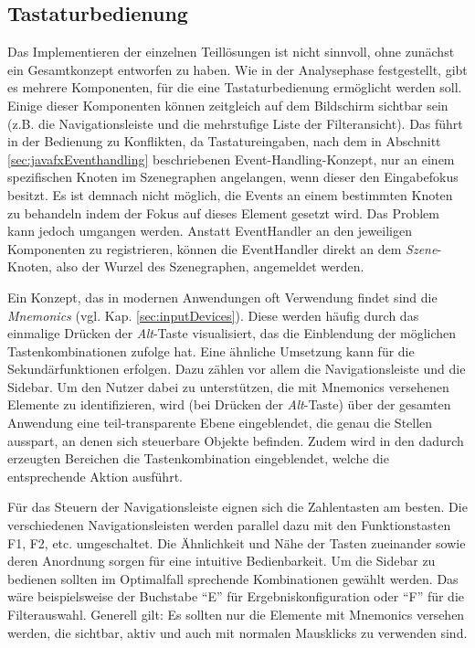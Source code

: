 \subsection{Tastaturbedienung} \label{sec:interactionKeyboard}
Das Implementieren der einzelnen Teillösungen ist nicht sinnvoll, ohne zunächst ein Gesamtkonzept entworfen zu haben. Wie in der Analysephase festgestellt, gibt es mehrere Komponenten, für die eine Tastaturbedienung ermöglicht werden soll. Einige dieser Komponenten können zeitgleich auf dem Bildschirm sichtbar sein (z.B. die Navigationsleiste und die mehrstufige Liste der Filteransicht). Das führt in der Bedienung zu Konflikten, da Tastatureingaben, nach dem in Abschnitt \ref{sec:javafxEventhandling} beschriebenen Event-Handling-Konzept, nur an einem spezifischen Knoten im Szenegraphen angelangen, wenn dieser den Eingabefokus besitzt. Es ist demnach nicht möglich, die Events an einem bestimmten Knoten zu behandeln indem der Fokus auf dieses Element gesetzt wird. Das Problem kann jedoch umgangen werden. Anstatt EventHandler an den jeweiligen Komponenten zu registrieren, können die EventHandler direkt an dem \textit{Szene}-Knoten, also der Wurzel des Szenegraphen, angemeldet werden.\par
{}
Ein Konzept, das in modernen Anwendungen oft Verwendung findet sind die \textit{Mnemonics} (vgl. Kap. \ref{sec:inputDevices}). Diese werden häufig durch das einmalige Drücken der \textit{Alt}-Taste visualisiert, das die Einblendung der möglichen Tastenkombinationen zufolge hat. Eine ähnliche Umsetzung kann für die Sekundärfunktionen erfolgen. Dazu zählen vor allem die Navigationsleiste und die Sidebar. Um den Nutzer dabei zu unterstützen, die mit Mnemonics versehenen Elemente zu identifizieren, wird (bei Drücken der \textit{Alt}-Taste) über der gesamten Anwendung eine teil-transparente Ebene eingeblendet, die genau die Stellen ausspart, an denen sich steuerbare Objekte befinden. Zudem wird in den dadurch erzeugten Bereichen die Tastenkombination eingeblendet, welche die entsprechende Aktion ausführt.\par
Für das Steuern der Navigationsleiste eignen sich die Zahlentasten am besten. Die verschiedenen Navigationsleisten werden parallel dazu mit den Funktionstasten F1, F2, etc. umgeschaltet. Die Ähnlichkeit und Nähe der Tasten zueinander sowie deren Anordnung sorgen für eine intuitive Bedienbarkeit. Um die Sidebar zu bedienen sollten im Optimalfall sprechende Kombinationen gewählt werden. Das wäre beispielsweise der Buchstabe \enquote{E} für Ergebniskonfiguration oder \enquote{F} für die Filterauswahl. Generell gilt: Es sollten nur die Elemente mit Mnemonics versehen werden, die sichtbar, aktiv und auch mit normalen Mausklicks zu verwenden sind.\par

